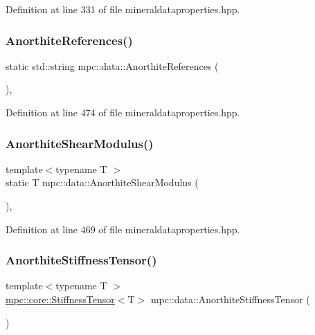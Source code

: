 Definition at line 331 of file mineraldataproperties.\+hpp.

\mbox{\label{namespacempc_1_1data_ad4c145d7a309c3ae5866f20cc6e9c81b}} 
\subsubsection{\texorpdfstring{Anorthite\+References()}{AnorthiteReferences()}}
{\footnotesize\ttfamily static std\+::string mpc\+::data\+::\+Anorthite\+References (\begin{DoxyParamCaption}{ }\end{DoxyParamCaption})\hspace{0.3cm}{\ttfamily [inline]}, {\ttfamily [static]}}



Definition at line 474 of file mineraldataproperties.\+hpp.

\mbox{\label{namespacempc_1_1data_a98b459e107a1b45c43b027961077dd65}} 
\subsubsection{\texorpdfstring{Anorthite\+Shear\+Modulus()}{AnorthiteShearModulus()}}
{\footnotesize\ttfamily template$<$typename T $>$ \\
static T mpc\+::data\+::\+Anorthite\+Shear\+Modulus (\begin{DoxyParamCaption}{ }\end{DoxyParamCaption})\hspace{0.3cm}{\ttfamily [inline]}, {\ttfamily [static]}}



Definition at line 469 of file mineraldataproperties.\+hpp.

\mbox{\label{namespacempc_1_1data_a58f2b45217ae44a33ec0fe3ea46f40eb}} 
\subsubsection{\texorpdfstring{Anorthite\+Stiffness\+Tensor()}{AnorthiteStiffnessTensor()}}
{\footnotesize\ttfamily template$<$typename T $>$ \\
\mbox{\hyperlink{structmpc_1_1core_1_1_stiffness_tensor}{mpc\+::core\+::\+Stiffness\+Tensor}}$<$T$>$ mpc\+::data\+::\+Anorthite\+Stiffness\+Tensor (\begin{DoxyParamCaption}{ }\end{DoxyParamCaption})}



